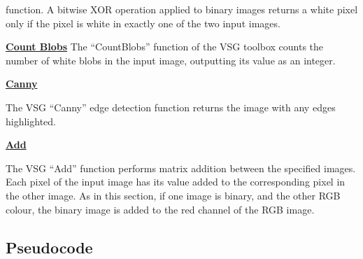 \documentclass[a4paper]{article}
\begin{document}
	function. A bitwise XOR operation applied to binary images returns a
	white pixel only if the pixel is white in exactly one of the two input
	images.
	\par\underline{\textbf{Count Blobs}}
	The ``CountBlobs'' function of the VSG toolbox counts the number of
	white blobs in the input image, outputting its value as an integer.
	\par\underline{\textbf{Canny}}
	\par The VSG ``Canny'' edge detection function returns the image with
	any edges highlighted.
	\par\underline{\textbf{Add}}
	\par The VSG ``Add'' function performs matrix addition between the
	specified images. Each pixel of the input image has its value added to
	the corresponding pixel in the other image. As in this section, if one
	image is binary, and the other RGB colour, the binary image is added to
	the red channel of the RGB image.
	\subsection{Pseudocode}
\end{document}

